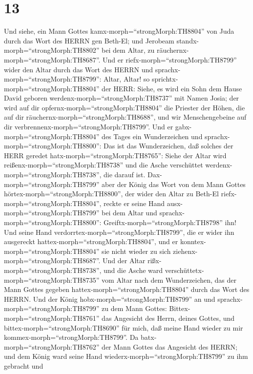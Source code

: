 \hypertarget{section-12}{%
\section{13}\label{section-12}}

 Und siehe, ein Mann Gottes
kamx-morph=``strongMorph:TH8804'' von Juda durch das Wort des HERRN gen
Beth-El; und Jerobeam standx-morph=``strongMorph:TH8802'' bei dem Altar,
zu räuchernx-morph=``strongMorph:TH8687''.  Und er
riefx-morph=``strongMorph:TH8799'' wider den Altar durch das Wort des
HERRN und sprachx-morph=``strongMorph:TH8799'': Altar, Altar! so
sprichtx-morph=``strongMorph:TH8804'' der HERR: Siehe, es wird ein Sohn
dem Hause David geboren werdenx-morph=``strongMorph:TH8737'' mit Namen
Josia; der wird auf dir opfernx-morph=``strongMorph:TH8804'' die
Priester der Höhen, die auf dir räuchernx-morph=``strongMorph:TH8688'',
und wir Menschengebeine auf dir
verbrennenx-morph=``strongMorph:TH8799''.  Und er
gabx-morph=``strongMorph:TH8804'' des Tages ein Wunderzeichen und
sprachx-morph=``strongMorph:TH8800'': Das ist das Wunderzeichen, daß
solches der HERR geredet hatx-morph=``strongMorph:TH8765'': Siehe der
Altar wird reißenx-morph=``strongMorph:TH8738'' und die Asche
verschüttet werdenx-morph=``strongMorph:TH8738'', die darauf ist.
 Dax-morph=``strongMorph:TH8799'' aber der König das Wort
von dem Mann Gottes hörtex-morph=``strongMorph:TH8800'', der wider den
Altar zu Beth-El riefx-morph=``strongMorph:TH8804'', reckte er seine
Hand ausx-morph=``strongMorph:TH8799'' bei dem Altar und
sprachx-morph=``strongMorph:TH8800'':
Greiftx-morph=``strongMorph:TH8798'' ihn! Und seine Hand
verdorrtex-morph=``strongMorph:TH8799'', die er wider ihn ausgereckt
hattex-morph=``strongMorph:TH8804'', und er
konntex-morph=``strongMorph:TH8804'' sie nicht wieder zu sich
ziehenx-morph=``strongMorph:TH8687''.  Und der Altar
rißx-morph=``strongMorph:TH8738'', und die Asche ward
verschüttetx-morph=``strongMorph:TH8735'' vom Altar nach dem
Wunderzeichen, das der Mann Gottes gegeben
hattex-morph=``strongMorph:TH8804'' durch das Wort des HERRN.
 Und der König hobx-morph=``strongMorph:TH8799'' an und
sprachx-morph=``strongMorph:TH8799'' zu dem Mann Gottes:
Bittex-morph=``strongMorph:TH8761'' das Angesicht des Herrn, deines
Gottes, und bittex-morph=``strongMorph:TH8690'' für mich, daß meine Hand
wieder zu mir kommex-morph=``strongMorph:TH8799''. Da
batx-morph=``strongMorph:TH8762'' der Mann Gottes das Angesicht des
HERRN; und dem König ward seine Hand
wiederx-morph=``strongMorph:TH8799'' zu ihm gebracht und
